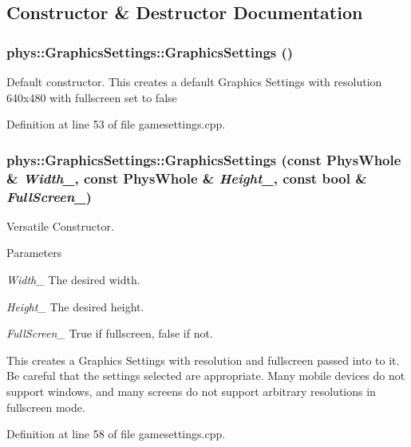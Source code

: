 \subsection{Constructor \& Destructor Documentation}
\hypertarget{classphys_1_1GraphicsSettings_aceaaf53585413067adbf271e2c1e48fa}{
\subsubsection[{GraphicsSettings}]{\setlength{\rightskip}{0pt plus 5cm}phys::GraphicsSettings::GraphicsSettings ()}}
\label{dc/df1/classphys_1_1GraphicsSettings_aceaaf53585413067adbf271e2c1e48fa}


Default constructor. This creates a default Graphics Settings with resolution 640x480 with fullscreen set to false 

Definition at line 53 of file gamesettings.cpp.\hypertarget{classphys_1_1GraphicsSettings_a58d20902f41ddf10db9f9a810a3910cc}{
\subsubsection[{GraphicsSettings}]{\setlength{\rightskip}{0pt plus 5cm}phys::GraphicsSettings::GraphicsSettings (const PhysWhole \& {\em Width\_\-}, \/  const PhysWhole \& {\em Height\_\-}, \/  const bool \& {\em FullScreen\_\-})}}
\label{dc/df1/classphys_1_1GraphicsSettings_a58d20902f41ddf10db9f9a810a3910cc}


Versatile Constructor. 
\begin{DoxyParams}{Parameters}
\item[{\em Width\_\-}]The desired width. \item[{\em Height\_\-}]The desired height. \item[{\em FullScreen\_\-}]True if fullscreen, false if not.\end{DoxyParams}
This creates a Graphics Settings with resolution and fullscreen passed into to it. Be careful that the settings selected are appropriate. Many mobile devices do not support windows, and many screens do not support arbitrary resolutions in fullscreen mode. 

Definition at line 58 of file gamesettings.cpp.

